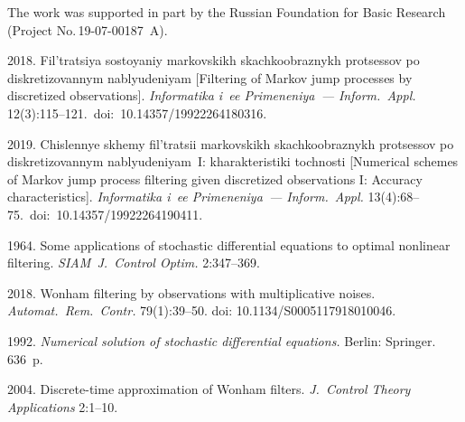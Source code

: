 




\Ack
\noindent
The work was supported in part by the Russian Foundation
for Basic Research (Project No.\,19-07-00187~A).



  \begin{multicols}{2}

\renewcommand{\bibname}{\protect\rmfamily References}

{\small\frenchspacing
 {%
 \begin{thebibliography}{9}


 2018. Fil'tratsiya sostoyaniy markovskikh skachkoobraznykh 
protsessov po diskretizovannym nablyudeniyam [Filtering of Markov 
jump processes by discretized observations].
\textit{Informatika i~ee Primeneniya~--- Inform.~Appl.}
12(3):115--121.~doi:~10.14357/19922264180316.

 2019. Chislennye skhemy fil'tratsii 
mar\-kov\-skikh skachkoobraznykh protsessov po dis\-kre\-ti\-zo\-van\-nym nablyudeniyam~I:  
kharakteristiki tochnosti [Numerical schemes of Markov jump process 
filtering given discretized observations I: Accuracy characteristics].
\textit{Informatika i~ee Primeneniya~--- Inform.~Appl.}
13(4):68--75.~doi:~10.14357/19922264190411.

 1964.
Some applications of stochastic differential equations to optimal
  nonlinear filtering. \textit{SIAM~J.~Control Optim.} 2:347--369. 

 2018. 
Wonham filtering by observations with multiplicative noises.
\textit{Automat.~Rem.~Contr.} 79(1):39--50.  
doi: 10.1134/S0005117918010046.

 1992.
\textit{Numerical solution of stochastic
differential equations.} Berlin: Springer. 636~p.

 2004. 
Discrete-time approximation of Wonham filters.
\textit{J.~Control Theory Applications} 2:1--10.


\end{thebibliography}}}
\end{multicols}

